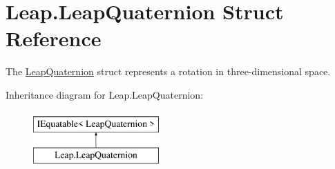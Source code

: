 \hypertarget{struct_leap_1_1_leap_quaternion}{}\section{Leap.\+Leap\+Quaternion Struct Reference}
\label{struct_leap_1_1_leap_quaternion}


The \mbox{\hyperlink{struct_leap_1_1_leap_quaternion}{Leap\+Quaternion}} struct represents a rotation in three-\/dimensional space.  


Inheritance diagram for Leap.\+Leap\+Quaternion\+:\begin{figure}[H]
\begin{center}
\leavevmode
\includegraphics[height=2.000000cm]{struct_leap_1_1_leap_quaternion}
\end{center}
\end{figure}
